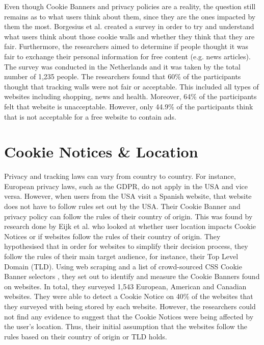 \documentclass[../main.tex]{subfiles}
\begin{document}
Even though Cookie Banners and privacy policies are a reality, the question still remains as to what users think about them, since they are the ones impacted by them the most. Borgesius et al. \cite{zuiderveen2017tracking} created a survey in order to try and understand what users think about those cookie walls and whether they think that they are fair. Furthermore, the researchers aimed to determine if people thought it was fair to exchange their personal information for free content (e.g. news articles). The survey was conducted in the Netherlands and it was taken by the total number of 1,235 people. The researchers found that 60\% of the participants thought that tracking walls were not fair or acceptable. This included all types of websites including shopping, news and health. Moreover, 64\% of the participants felt that  website is unacceptable. However, only 44.9\% of the participants think that is not acceptable for a free website to contain ads.

\section{Cookie Notices \& Location}
Privacy and tracking laws can vary from country to country. For instance, European privacy laws, such as the GDPR, do not apply in the USA and vice versa. However, when users from the USA visit a Spanish website, that website does not have to follow rules set out by the USA. Their Cookie Banner and privacy policy can follow the rules of their country of origin. This was found by research done by Eijk et al. \cite{eijk2019impact} who looked at whether user location impacts Cookie Notices or if websites follow the rules of their country of origin. They hypothesised that in order for websites to simplify their decision process, they follow the rules of their main target audience, for instance, their Top Level Domain (TLD). Using web scraping and a list of crowd-sourced CSS Cookie Banner selectors \cite{kladnik}, they set out to identify and measure the Cookie Banners found on websites. In total, they surveyed 1,543 European, American and Canadian websites. They were able to detect a Cookie Notice on 40\% of the websites that they surveyed with  being stored by each website. However, the researchers could not find any evidence to suggest that the Cookie Notices were being affected by the user’s location. Thus, their initial assumption that the websites follow the rules based on their country of origin or TLD holds.
\end{document}
